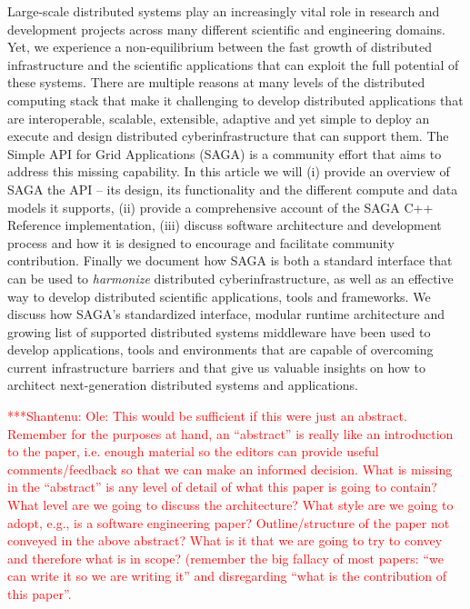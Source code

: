 \documentclass[a4paper,10pt]{article}
\newcommand{\jhanote}[1]{  {\textcolor{red}     { ***Shantenu: #1 }}}
\newcommand{\jhanote}[1]{}
\begin{document}
Large-scale distributed systems play an increasingly vital role in
research and development projects across many different scientific and
engineering domains. Yet, we experience a non-equilibrium between the
fast growth of distributed infrastructure and the scientific
applications that can exploit the full potential of these
systems. There are multiple reasons at many levels of the distributed
computing stack that make it challenging to develop distributed
applications that are interoperable, scalable, extensible, adaptive
and yet simple to deploy an execute and design distributed
cyberinfrastructure that can support them.  The Simple API for Grid
Applications (SAGA) is a community effort that aims to address this
missing capability.  In this article we will (i) provide an overview
of SAGA the API -- its design, its functionality and the different
compute and data models it supports, (ii) provide a comprehensive
account of the SAGA C++ Reference implementation, (iii) discuss
software architecture and development process and how it is designed
to encourage and facilitate community contribution.  Finally we
document how SAGA is both a standard interface that can be used to
{\it harmonize} distributed cyberinfrastructure, as well as an
effective way to develop distributed scientific applications, tools
and frameworks.  We discuss how SAGA's standardized interface, modular
runtime architecture and growing list of supported distributed systems
middleware have been used to develop applications, tools and
environments that are capable of overcoming current infrastructure
barriers and that give us valuable insights on how to architect
next-generation distributed systems and applications.

\jhanote{Ole: This would be sufficient if this were just an
  abstract. Remember for the purposes at hand, an ``abstract'' is
  really like an introduction to the paper, i.e. enough material so
  the editors can provide useful comments/feedback so that we can make
  an informed decision. What is missing in the ``abstract'' is any
  level of detail of what this paper is going to contain? What level
  are we going to discuss the architecture? What style are we going to
  adopt, e.g., is a software engineering paper?  Outline/structure of
  the paper not conveyed in the above abstract? What is it that we are
  going to try to convey and therefore what is in scope? (remember the
  big fallacy of most papers: ``we can write it so we are writing it''
  and disregarding ``what is the contribution of this paper''.}
\end{document}
